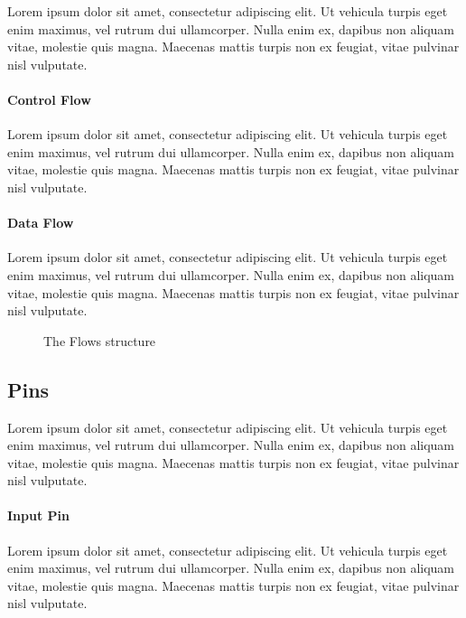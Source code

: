 Lorem ipsum dolor sit amet, consectetur adipiscing elit. Ut vehicula turpis eget enim maximus, vel rutrum dui ullamcorper. Nulla enim ex, dapibus non aliquam vitae, molestie quis magna. Maecenas mattis turpis non ex feugiat, vitae pulvinar nisl vulputate.

\paragraph{Control Flow}

Lorem ipsum dolor sit amet, consectetur adipiscing elit. Ut vehicula turpis eget enim maximus, vel rutrum dui ullamcorper. Nulla enim ex, dapibus non aliquam vitae, molestie quis magna. Maecenas mattis turpis non ex feugiat, vitae pulvinar nisl vulputate.

\paragraph{Data Flow}\label{par:data_flow}

Lorem ipsum dolor sit amet, consectetur adipiscing elit. Ut vehicula turpis eget enim maximus, vel rutrum dui ullamcorper. Nulla enim ex, dapibus non aliquam vitae, molestie quis magna. Maecenas mattis turpis non ex feugiat, vitae pulvinar nisl vulputate.

\begin{figure}[!ht]
	\centering
	
	\caption{The Flows structure}
	\label{fig:flows}
\end{figure}

\subsection{Pins}\label{ssec:pins}

Lorem ipsum dolor sit amet, consectetur adipiscing elit. Ut vehicula turpis eget enim maximus, vel rutrum dui ullamcorper. Nulla enim ex, dapibus non aliquam vitae, molestie quis magna. Maecenas mattis turpis non ex feugiat, vitae pulvinar nisl vulputate.

\paragraph{Input Pin}

Lorem ipsum dolor sit amet, consectetur adipiscing elit. Ut vehicula turpis eget enim maximus, vel rutrum dui ullamcorper. Nulla enim ex, dapibus non aliquam vitae, molestie quis magna. Maecenas mattis turpis non ex feugiat, vitae pulvinar nisl vulputate.


